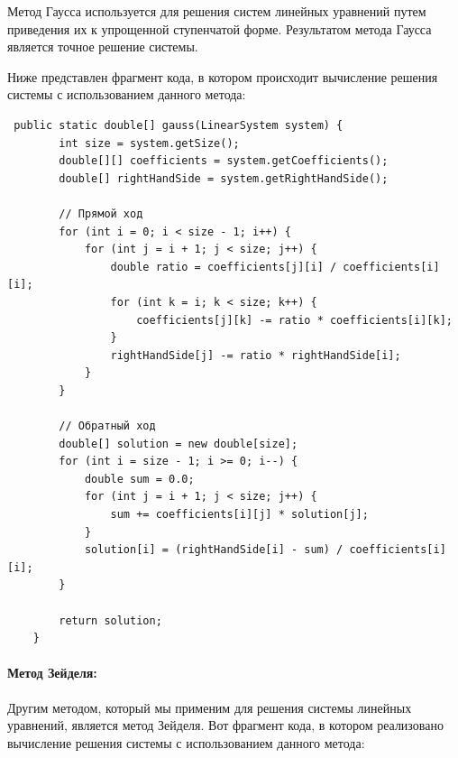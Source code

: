\documentclass[12pt]{article}
\begin{document}
    Метод Гаусса используется для решения систем линейных уравнений путем приведения их к упрощенной ступенчатой форме. Результатом метода Гаусса является точное решение системы.

    Ниже представлен фрагмент кода, в котором происходит вычисление решения системы с использованием данного метода:

    \begin{verbatim}
 public static double[] gauss(LinearSystem system) {
        int size = system.getSize();
        double[][] coefficients = system.getCoefficients();
        double[] rightHandSide = system.getRightHandSide();

        // Прямой ход
        for (int i = 0; i < size - 1; i++) {
            for (int j = i + 1; j < size; j++) {
                double ratio = coefficients[j][i] / coefficients[i][i];
                for (int k = i; k < size; k++) {
                    coefficients[j][k] -= ratio * coefficients[i][k];
                }
                rightHandSide[j] -= ratio * rightHandSide[i];
            }
        }

        // Обратный ход
        double[] solution = new double[size];
        for (int i = size - 1; i >= 0; i--) {
            double sum = 0.0;
            for (int j = i + 1; j < size; j++) {
                sum += coefficients[i][j] * solution[j];
            }
            solution[i] = (rightHandSide[i] - sum) / coefficients[i][i];
        }

        return solution;
    }
    \end{verbatim}

    \paragraph{Метод Зейделя:}
    Другим методом, который мы применим для решения системы линейных уравнений, является метод Зейделя. Вот фрагмент кода, в котором реализовано вычисление решения системы с использованием данного метода:
\end{document}
